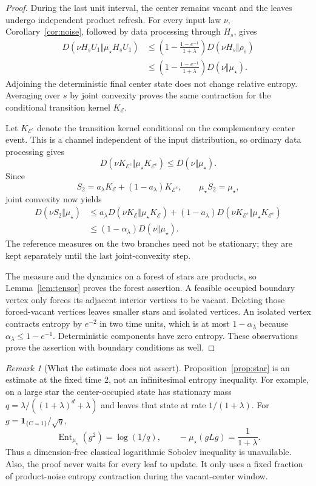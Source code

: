 \documentclass[11pt,reqno]{amsart}
\theoremstyle{remark}
\newtheorem{remark}[theorem]{Remark}
\newcommand{\one}{\mathbf 1}
\DeclareMathOperator{\Ent}{Ent}
\numberwithin{equation}{section}
\begin{document}
\begin{proof}
During the last unit interval, the center remains vacant and the leaves undergo independent product refresh. For every input law $\nu$, Corollary~\ref{cor:noise}, followed by data processing through $H_s$, gives
\begin{align*}
 D(\nu H_sU_1\Vert\mu_\star H_sU_1)
 &\le\left(1-\frac{1-e^{-1}}{1+\lambda}\right)
       D(\nu H_s\Vert\rho_s)\\
 &\le\left(1-\frac{1-e^{-1}}{1+\lambda}\right)
       D(\nu\Vert\mu_\star).
\end{align*}
Adjoining the deterministic final center state does not change relative entropy. Averaging over $s$ by joint convexity proves the same contraction for the conditional transition kernel $K_{\mathcal E}$.

Let $K_{\mathcal E^c}$ denote the transition kernel conditional on the complementary center event. This is a channel independent of the input distribution, so ordinary data processing gives
\[
 D(\nu K_{\mathcal E^c}\Vert\mu_\star K_{\mathcal E^c})
 \le D(\nu\Vert\mu_\star).
\]
Since
\[
 S_2=a_\lambda K_{\mathcal E}+(1-a_\lambda)K_{\mathcal E^c},
 \qquad \mu_\star S_2=\mu_\star,
\]
joint convexity now yields
\begin{align*}
 D(\nu S_2\Vert\mu_\star)
 &\le a_\lambda D(\nu K_{\mathcal E}\Vert\mu_\star K_{\mathcal E})
 +(1-a_\lambda)D(\nu K_{\mathcal E^c}\Vert\mu_\star K_{\mathcal E^c})\\
 &\le(1-\alpha_\lambda)D(\nu\Vert\mu_\star).
\end{align*}
The reference measures on the two branches need not be stationary; they are kept separately until the last joint-convexity step.

The measure and the dynamics on a forest of stars are products, so Lemma~\ref{lem:tensor} proves the forest assertion. A feasible occupied boundary vertex only forces its adjacent interior vertices to be vacant. Deleting those forced-vacant vertices leaves smaller stars and isolated vertices. An isolated vertex contracts entropy by $e^{-2}$ in two time units, which is at most $1-\alpha_\lambda$ because $\alpha_\lambda\le1-e^{-1}$. Deterministic components have zero entropy. These observations prove the assertion with boundary conditions as well.
\end{proof}

\begin{remark}[What the estimate does not assert]\label{rem:finite}
Proposition~\ref{prop:star} is an estimate at the fixed time $2$, not an infinitesimal entropy inequality. For example, on a large star the center-occupied state has stationary mass $q=\lambda/((1+\lambda)^d+\lambda)$ and leaves that state at rate $1/(1+\lambda)$. For $g=\one_{\{C=1\}}/\sqrt q$,
\[
 \Ent_{\mu_\star}(g^2)=\log(1/q),\qquad
 -\mu_\star(gL g)=\frac1{1+\lambda}.
\]
Thus a dimension-free classical logarithmic Sobolev inequality is unavailable. Also, the proof never waits for every leaf to update. It only uses a fixed fraction of product-noise entropy contraction during the vacant-center window.
\end{remark}
\end{document}
